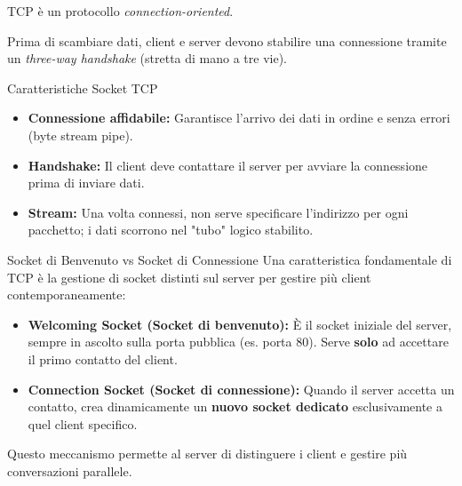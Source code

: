 \documentclass[a4paper,12pt]{report}
\begin{document}
TCP è un protocollo \textit{connection-oriented}. 

Prima di scambiare dati, client e server devono stabilire una connessione tramite un \textit{three-way handshake} (stretta di mano a tre vie).

\begin{defbox}{Caratteristiche Socket TCP}
\begin{itemize}
    \item \textbf{Connessione affidabile:} Garantisce l'arrivo dei dati in ordine e senza errori (byte stream pipe).
    \item \textbf{Handshake:} Il client deve contattare il server per avviare la connessione prima di inviare dati.
    \item \textbf{Stream:} Una volta connessi, non serve specificare l'indirizzo per ogni pacchetto; i dati scorrono nel "tubo" logico stabilito.
\end{itemize}
\end{defbox}

\begin{notebox}{Socket di Benvenuto vs Socket di Connessione}
Una caratteristica fondamentale di TCP è la gestione di socket distinti sul server per gestire più client contemporaneamente:

\begin{itemize}
    \item \textbf{Welcoming Socket (Socket di benvenuto):} È il socket iniziale del server, sempre in ascolto sulla porta pubblica (es. porta 80). Serve \textbf{solo} ad accettare il primo contatto del client.
    \item \textbf{Connection Socket (Socket di connessione):} Quando il server accetta un contatto, crea dinamicamente un \textbf{nuovo socket dedicato} esclusivamente a quel client specifico.
\end{itemize}

Questo meccanismo permette al server di distinguere i client e gestire più conversazioni parallele.
\end{notebox}
\end{document}
